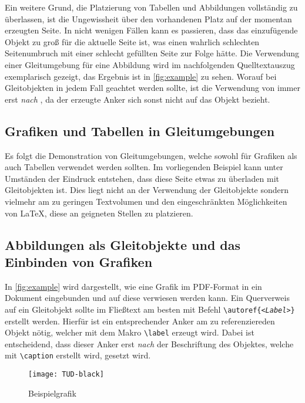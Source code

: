 \documentclass[%
  english,ngerman,%
  cdgeometry=no,DIV=12,automark,%
]{tudscrartcl}
\begin{document}
Ein weitere Grund,  die Platzierung von Tabellen und Abbildungen 
vollständig zu überlassen, ist die Ungewissheit über den vorhandenen Platz auf 
der momentan erzeugten Seite. In nicht wenigen Fällen kann es passieren, dass 
das einzufügende Objekt zu groß für die aktuelle Seite ist, was einen wahrlich 
schlechten Seitenumbruch mit einer schlecht gefüllten Seite zur Folge hätte.
Die Verwendung einer Gleitumgebung für eine Abbildung wird im nachfolgenden 
Quelltextauszug exemplarisch gezeigt, das Ergebnis ist in \autoref{fig:example} 
zu sehen. Worauf bei Gleitobjekten in jedem Fall geachtet werden sollte, ist 
die Verwendung von  immer erst \emph{nach} , da 
der erzeugte Anker sich sonst nicht auf das Objekt bezieht.
%
\begin{Trunk+}
\section{Grafiken und Tabellen in Gleitumgebungen}
Es folgt die Demonstration von Gleitumgebungen, welche sowohl für 
Grafiken als auch Tabellen verwendet werden sollten. Im vorliegenden 
Beispiel kann unter Umständen der Eindruck entstehen, dass diese Seite 
etwas zu überladen mit Gleitobjekten ist. Dies liegt nicht an der 
Verwendung der Gleitobjekte sondern vielmehr am zu geringen Textvolumen 
und den eingeschränkten Möglichkeiten von \LaTeX{}, diese an geigneten 
Stellen zu platzieren. 

\subsection{Abbildungen als Gleitobjekte und das Einbinden von Grafiken}
In \autoref{fig:example} wird dargestellt, wie eine Grafik im PDF-Format 
in ein Dokument eingebunden und auf diese verwiesen werden kann. Ein 
Querverweis auf ein Gleitobjekt sollte im Fließtext am besten mit Befehl 
\texttt{\textbackslash autoref\{\emph{<Label>}\}} erstellt werden. 
Hierfür ist ein entsprechender Anker am zu referenziereden Objekt nötig, 
welcher mit dem Makro \texttt{\textbackslash label} erzeugt wird. Dabei 
ist entscheidend, dass dieser Anker erst \emph{nach} der Beschriftung des 
Objektes, welche mit \texttt{\textbackslash caption} erstellt wird, 
gesetzt wird.

\end{Trunk+}
\begin{Trunk}
\begin{figure}
\centering
\texttt{[image: TUD-black]}
\caption{Beispielgrafik}\label{fig:example}
\end{figure}

\end{Trunk}
\end{document}
